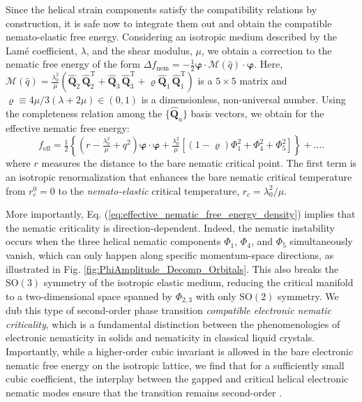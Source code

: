 \documentclass[aps,prb, twocolumn, superscriptaddress, amsmath, amsfonts, amssymb, amsthm]{revtex4-2}
\renewcommand{\eqref}[1]{Eq. (\ref{#1})}
\begin{document}
Since the helical strain components satisfy the compatibility relations by construction, it is safe now to integrate them out and obtain the compatible nemato-elastic free energy. Considering an isotropic medium described by the Lam\'e coefficient,  $\lambda$, and the shear modulus,  $\mu$, we obtain a correction to the nematic free energy of the form
$\Delta f_{\text{nem}} = - \frac{1}{2} \boldsymbol{\varphi} \cdot \mathcal{M}(\hat{q}) \cdot \boldsymbol{\varphi}$. Here, $\mathcal{M}\left(\hat{q}\right)=\frac{\lambda_{0}^{2}}{\mu}(\boldsymbol{\hat{Q}}_{2}^{\phantom{\text{T}}}\boldsymbol{\hat{Q}}_{2}^{\text{T}}+\boldsymbol{\hat{Q}}_{3}^{\phantom{\text{T}}}\boldsymbol{\hat{Q}}_{3}^{\text{T}}+\varrho\boldsymbol{\hat{Q}}_{1}^{\phantom{\text{T}}}\boldsymbol{\hat{Q}}_{1}^{\text{T}})$ is a  $5\times 5$  matrix and $\varrho \equiv 4\mu/3(\lambda + 2\mu)\in (0,1)$  is a dimensionless, non-universal number. Using the completeness relation among the $\{\boldsymbol{\hat{Q}}_a\}$ basis vectors, we obtain for the effective nematic free energy:
{\small
\begin{equation}
   f_{\text{eff}}=\tfrac{1}{2}\left\{ \left(r-\tfrac{\lambda_{0}^{2}}{\mu}+q^{2}\right)\boldsymbol{\varphi}\cdot\boldsymbol{\varphi}+\tfrac{\lambda_{0}^{2}}{\mu}\left[\left(1-\varrho\right)\Phi_{1}^{2}+\Phi_{4}^{2}+\Phi_{5}^{2}\right]\right\} +\dots.\label{eq:effective_nematic_free_energy_density}
\end{equation}}
\unskip\hspace{0pt}where $r$  measures the distance to the bare nematic critical point. The first term is an isotropic renormalization that enhances the bare nematic critical temperature from $r_c^0 = 0$ to the \textit{nemato-elastic} critical temperature,  $r_c = \lambda^2_0/\mu$.

More importantly, \eqref{eq:effective_nematic_free_energy_density} implies that the nematic criticality is direction-dependent. Indeed, the nematic instability occurs when the three helical nematic components $\Phi_1$, $\Phi_4$, and $\Phi_5$ simultaneously vanish, which can only happen along specific momentum-space directions, as illustrated in Fig. \ref{fig:PhiAmplitude_Decomp_Orbitals}. This also breaks the $\text{SO}(3)$  symmetry of the isotropic elastic medium, reducing the critical manifold to a two-dimensional space spanned by $\Phi_{2,3}$ with only $\text{SO}(2)$ symmetry. We dub this type of second-order phase transition \textit{compatible electronic nematic criticality}, which is a fundamental distinction between the phenomenologies of electronic nematicity in solids and nematicity in classical liquid crystals. Importantly, while a higher-order cubic invariant is allowed in the bare electronic nematic free energy on the isotropic lattice, we find that for a sufficiently small cubic coefficient, the interplay between the gapped and critical helical electronic nematic modes ensure that the transition remains second-order \cite{LongPaper}.
\end{document}
